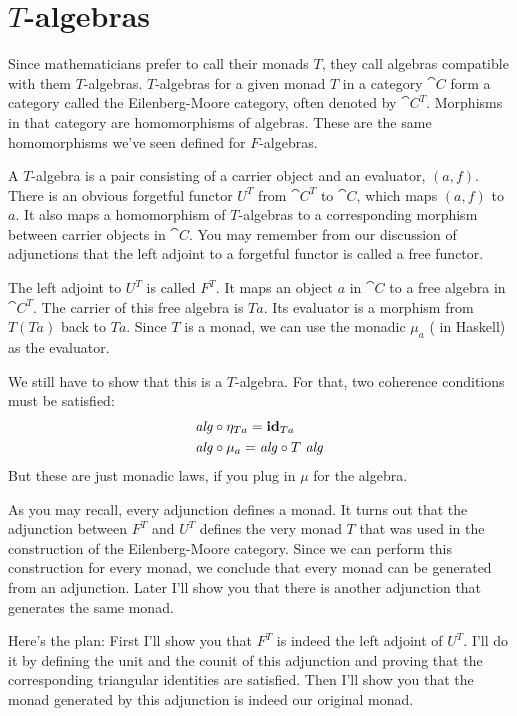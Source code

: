 \section{$T$-algebras}

Since mathematicians prefer to call their monads $T$, they call
algebras compatible with them $T$-algebras. $T$-algebras for a given monad $T$
in a category $\cat{C}$ form a category called the Eilenberg-Moore
category, often denoted by $\cat{C}^T$. Morphisms in that
category are homomorphisms of algebras. These are the same homomorphisms
we've seen defined for $F$-algebras.

A $T$-algebra is a pair consisting of a carrier object and an evaluator,
$(a, f)$. There is an obvious forgetful functor $U^T$ from
$\cat{C}^T$ to $\cat{C}$, which maps $(a, f)$ to $a$. It
also maps a homomorphism of $T$-algebras to a corresponding morphism
between carrier objects in $\cat{C}$. You may remember from our discussion of
adjunctions that the left adjoint to a forgetful functor is called a
free functor.

The left adjoint to $U^T$ is called $F^T$. It maps an object
$a$ in $\cat{C}$ to a free algebra in $\cat{C}^T$. The carrier
of this free algebra is $T a$. Its evaluator is a morphism from
$T (T a)$ back to $T a$. Since $T$ is a monad,
we can use the monadic $\mu_a$ ( in Haskell) as the
evaluator.

We still have to show that this is a $T$-algebra. For that, two coherence
conditions must be satisfied:
\[
	\begin{aligned}
		\mathit{alg} & \circ \eta_{Ta} = \id_{Ta}                       \\
		\mathit{alg} & \circ \mu_a = \mathit{alg} \circ T\ \mathit{alg}
	\end{aligned}
\]
But these are just monadic laws, if you plug in $\mu$ for the
algebra.

As you may recall, every adjunction defines a monad. It turns out that
the adjunction between $F^T$ and $U^T$
defines the very monad $T$ that was used in the construction of
the Eilenberg-Moore category. Since we can perform this construction for
every monad, we conclude that every monad can be generated from an
adjunction. Later I'll show you that there is another adjunction that
generates the same monad.

Here's the plan: First I'll show you that $F^T$ is indeed the left
adjoint of $U^T$. I'll do it by defining the unit and the counit
of this adjunction and proving that the corresponding triangular
identities are satisfied. Then I'll show you that the monad generated by
this adjunction is indeed our original monad.

